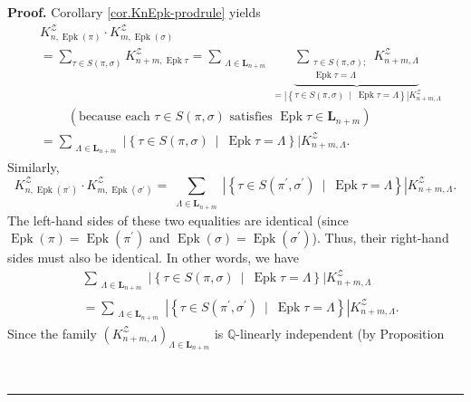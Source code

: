 \documentclass[numbers=enddot,12pt,final,onecolumn,notitlepage]{scrartcl}%
\theoremstyle{definition}
\newenvironment{proof}[1][Proof]{\noindent\textbf{#1.} }{\ \rule{0.5em}{0.5em}}
\let\sumnonlimits\sum
\renewcommand{\sum}{\sumnonlimits\limits}
\begin{document}
\begin{proof}
Corollary \ref{cor.KnEpk-prodrule} yields
\begin{align*}
&  K_{n,\operatorname*{Epk}\left(  \pi\right)  }^{\mathcal{Z}}\cdot
K_{m,\operatorname*{Epk}\left(  \sigma\right)  }^{\mathcal{Z}}\\
&  =\sum_{\tau\in S\left(  \pi,\sigma\right)  }K_{n+m,\operatorname*{Epk}\tau
}^{\mathcal{Z}}=\sum_{\substack{\Lambda\in\mathbf{L}_{n+m}}}\underbrace{\sum
_{\substack{\tau\in S\left(  \pi,\sigma\right)  ;\\\operatorname*{Epk}%
\tau=\Lambda}}K_{n+m,\Lambda}^{\mathcal{Z}}}_{=\left\vert \left\{  \tau\in
S\left(  \pi,\sigma\right)  \ \mid\ \operatorname*{Epk}\tau=\Lambda\right\}
\right\vert K_{n+m,\Lambda}^{\mathcal{Z}}}\\
&  \ \ \ \ \ \ \ \ \ \ \left(  \text{because each }\tau\in S\left(  \pi
,\sigma\right)  \text{ satisfies }\operatorname*{Epk}\tau\in\mathbf{L}%
_{n+m}\right)  \\
&  =\sum_{\substack{\Lambda\in\mathbf{L}_{n+m}}}\left\vert \left\{  \tau\in
S\left(  \pi,\sigma\right)  \ \mid\ \operatorname*{Epk}\tau=\Lambda\right\}
\right\vert K_{n+m,\Lambda}^{\mathcal{Z}}.
\end{align*}
Similarly,%
\[
K_{n,\operatorname*{Epk}\left(  \pi^{\prime}\right)  }^{\mathcal{Z}}\cdot
K_{m,\operatorname*{Epk}\left(  \sigma^{\prime}\right)  }^{\mathcal{Z}}%
=\sum_{\substack{\Lambda\in\mathbf{L}_{n+m}}}\left\vert \left\{  \tau\in
S\left(  \pi^{\prime},\sigma^{\prime}\right)  \ \mid\ \operatorname*{Epk}%
\tau=\Lambda\right\}  \right\vert K_{n+m,\Lambda}^{\mathcal{Z}}.
\]
The left-hand sides of these two equalities are identical (since
$\operatorname*{Epk}\left(  \pi\right)  =\operatorname*{Epk}\left(
\pi^{\prime}\right)  $ and $\operatorname*{Epk}\left(  \sigma\right)
=\operatorname*{Epk}\left(  \sigma^{\prime}\right)  $). Thus, their right-hand
sides must also be identical. In other words, we have%
\begin{align*}
&  \sum_{\substack{\Lambda\in\mathbf{L}_{n+m}}}\left\vert \left\{  \tau\in
S\left(  \pi,\sigma\right)  \ \mid\ \operatorname*{Epk}\tau=\Lambda\right\}
\right\vert K_{n+m,\Lambda}^{\mathcal{Z}}\\
&  =\sum_{\substack{\Lambda\in\mathbf{L}_{n+m}}}\left\vert \left\{  \tau\in
S\left(  \pi^{\prime},\sigma^{\prime}\right)  \ \mid\ \operatorname*{Epk}%
\tau=\Lambda\right\}  \right\vert K_{n+m,\Lambda}^{\mathcal{Z}}.
\end{align*}
Since the family $\left(  K_{n+m,\Lambda}^{\mathcal{Z}}\right)  _{\Lambda
\in\mathbf{L}_{n+m}}$ is $\mathbb{Q}$-linearly independent (by Proposition

\end{proof}
\end{document}
